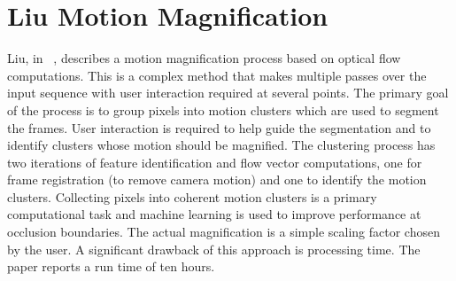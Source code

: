 \documentclass[letterpaper]{article}
\date{\today}
\begin{document}
\maketitle

\section{Liu Motion Magnification}
Liu, in ~\cite{Liu-lagrange}, describes a motion magnification process
based on optical flow computations.  This is a complex method that
makes multiple passes over the input sequence with user interaction
required at several points.  The primary goal of the process is to
group pixels into motion clusters which are used to segment the
frames.  User interaction is required to help guide the segmentation
and to identify clusters whose motion should be magnified.  The
clustering process has two iterations of feature identification and
flow vector computations, one for frame registration (to remove camera
motion) and one to identify the motion clusters.  Collecting pixels
into coherent motion clusters is a primary computational task and
machine learning is used to improve performance at occlusion
boundaries.  The actual magnification is a simple scaling factor
chosen by the user.  A significant drawback of this approach is
processing time.  The paper reports a run time of ten hours.



\end{document}

